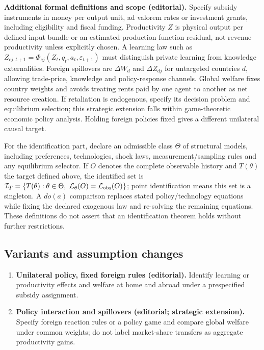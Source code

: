 \documentclass[11pt,a4paper]{article}
\begin{document}
\textbf{Additional formal definitions and scope (editorial).} Specify subsidy instruments in money per output unit, ad valorem rates or investment grants, including eligibility and fiscal funding. Productivity \(Z\) is physical output per defined input bundle or an estimated production-function residual, not revenue productivity unless explicitly chosen. A learning law such as \(Z_{cj,t+1}=\Phi_{cj}(Z_t,q_t,a_t,\varepsilon_{t+1})\) must distinguish private learning from knowledge externalities. Foreign spillovers are \(\Delta W_d\) and \(\Delta Z_{dj}\) for untargeted countries \(d\), allowing trade-price, knowledge and policy-response channels. Global welfare fixes country weights and avoids treating rents paid by one agent to another as net resource creation. If retaliation is endogenous, specify its decision problem and equilibrium selection; this strategic extension falls within game-theoretic economic policy analysis. Holding foreign policies fixed gives a different unilateral causal target.

For the identification part, declare an admissible class \(\Theta\) of structural models, including preferences, technologies, shock laws, measurement/sampling rules and any equilibrium selector. If \(O\) denotes the complete observable history and \(T(\theta)\) the target defined above, the identified set is \(\mathcal I_T=\{T(\theta):\theta\in\Theta,\ \mathcal L_\theta(O)=\mathcal L_{\rm obs}(O)\}\); point identification means this set is a singleton. A \(do(a)\) comparison replaces stated policy/technology equations while fixing the declared exogenous law and re-solving the remaining equations. These definitions do not assert that an identification theorem holds without further restrictions.
\subsection*{Variants and assumption changes}
\begin{enumerate}
\item \textbf{Unilateral policy, fixed foreign rules (editorial).} Identify learning or productivity effects and welfare at home and abroad under a prespecified subsidy assignment.
\item \textbf{Policy interaction and spillovers (editorial; strategic extension).} Specify foreign reaction rules or a policy game and compare global welfare under common weights; do not label market-share transfers as aggregate productivity gains.
\end{enumerate}
\end{document}
